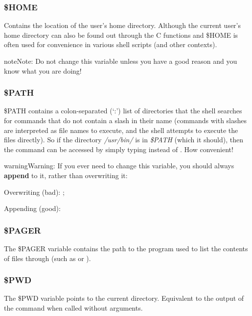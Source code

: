 \documentclass[a4paper,11pt,english]{sphinxmanual}
\begin{document}
\subsubsection{\$HOME}
\label{introduction:home}
Contains the location of the user's home directory. Although the current user's home directory can also be found out through the
C functions  and  \$HOME is often used for convenience in various shell scripts (and other contexts).

\begin{notice}{note}{Note:}
Do not change this variable unless you have a good reason and you know what you are doing!
\end{notice}


\subsubsection{\$PATH}
\label{introduction:path}\label{introduction:id2}
\$PATH contains a colon-separated (`:') list of directories that the shell searches for commands that do not contain a slash in their name
(commands with slashes are interpreted as file names to execute, and the shell attempts to execute the files directly).
So if the directory \emph{/usr/bin/} is in \emph{\$PATH} (which it should), then the command  can be accessed by simply typing  instead of
. How convenient!

\begin{notice}{warning}{Warning:}
If you ever need to change this variable, you should always \textbf{append} to it, rather
than overwriting it:

Overwriting (bad): ;

Appending (good): 
\end{notice}


\subsubsection{\$PAGER}
\label{introduction:pager}
The \$PAGER variable contains the path to the program used to list the contents of files through (such as  or ).


\subsubsection{\$PWD}
\label{introduction:pwd}
The \$PWD variable points to the current directory. Equivalent to the output of the command  when called without arguments.
\end{document}
